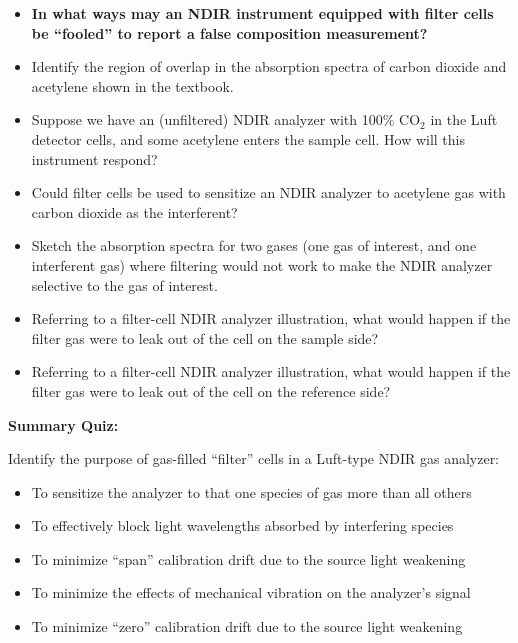 \begin{itemize}
\item{} {\bf In what ways may an NDIR instrument equipped with filter cells be ``fooled'' to report a false composition measurement?}
\item{} Identify the region of overlap in the absorption spectra of carbon dioxide and acetylene shown in the textbook.
\item{} Suppose we have an (unfiltered) NDIR analyzer with 100\% CO$_{2}$ in the Luft detector cells, and some acetylene enters the sample cell.  How will this instrument respond?
\item{} Could filter cells be used to sensitize an NDIR analyzer to acetylene gas with carbon dioxide as the interferent?
\item{} Sketch the absorption spectra for two gases (one gas of interest, and one interferent gas) where filtering would not work to make the NDIR analyzer selective to the gas of interest.
\item{} Referring to a filter-cell NDIR analyzer illustration, what would happen if the filter gas were to leak out of the cell on the sample side?
\item{} Referring to a filter-cell NDIR analyzer illustration, what would happen if the filter gas were to leak out of the cell on the reference side?
\end{itemize}






\vfil \eject

\noindent
{\bf Summary Quiz:}

Identify the purpose of gas-filled ``filter'' cells in a Luft-type NDIR gas analyzer:

\begin{itemize}
\item{} To sensitize the analyzer to that one species of gas more than all others
\vskip 5pt
\item{} To effectively block light wavelengths absorbed by interfering species
\vskip 5pt
\item{} To minimize ``span'' calibration drift due to the source light weakening
\vskip 5pt
\item{} To minimize the effects of mechanical vibration on the analyzer's signal
\vskip 5pt
\item{} To minimize ``zero'' calibration drift due to the source light weakening
\end{itemize}






